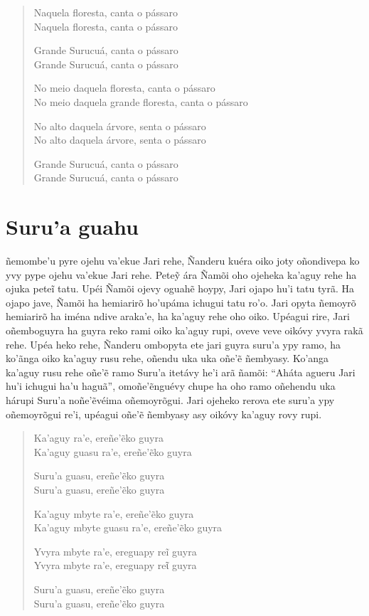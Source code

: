 \begin{verse}
Naquela floresta, canta o pássaro\\
Naquela floresta, canta o pássaro

Grande Surucuá, canta o pássaro\\
Grande Surucuá, canta o pássaro

No meio daquela floresta, canta o pássaro\\
No meio daquela grande floresta, canta o  pássaro

\pagebreak
No alto daquela árvore, senta o pássaro\\
No alto daquela árvore, senta o pássaro

Grande Surucuá, canta o pássaro\\
Grande Surucuá, canta o pássaro
\end{verse}

\chapter{Suru'a guahu}

 ñemombe'u pyre ojehu va'ekue Jari rehe, Ñanderu kuéra oiko joty
oñondivepa ko yvy pype ojehu va'ekue Jari rehe. Peteỹ ára Ñamõi oho
ojeheka ka'aguy rehe ha ojuka peteĩ tatu. Upéi Ñamõi ojevy oguahẽ hoypy,
Jari ojapo hu'i tatu tyrã. Ha ojapo jave, Ñamõi ha hemiarirõ ho'upáma
ichugui tatu ro'o. Jari opyta ñemoyrõ hemiarirõ ha iména ndive araka'e,
ha ka'aguy rehe oho oiko. Upéagui rire, Jari oñemboguyra ha guyra reko
rami oiko ka'aguy rupi, oveve veve oikóvy yvyra rakã rehe. Upéa heko
rehe, Ñanderu ombopyta ete jari guyra suru'a ypy ramo, ha ko'ãnga oiko
ka'aguy rusu rehe, oñendu uka uka oñe'ẽ ñembyasy. Ko'anga ka'aguy rusu
rehe oñe'ẽ ramo Suru'a itetávy he'i arã ñamõi: ``Aháta agueru Jari hu'i
ichugui ha'u haguã'', omoñe'ẽnguévy chupe ha oho ramo oñehendu uka
hárupi Suru'a noñe'ẽvéima oñemoyrõgui. Jari ojeheko rerova ete suru'a
ypy oñemoyrõgui re'i, upéagui oñe'ẽ ñembyasy asy oikóvy ka'aguy rovy
rupi.

\begin{verse}
Ka'aguy ra'e, ereñe'ẽko guyra\\
Ka'aguy guasu ra'e, ereñe'ẽko guyra
       
Suru'a guasu, ereñe'ẽko guyra\\
Suru'a guasu, ereñe'ẽko guyra
       
Ka'aguy mbyte ra'e, ereñe'ẽko guyra\\
Ka'aguy mbyte guasu ra'e, ereñe'ẽko guyra
       
Yvyra mbyte ra'e, ereguapy reĩ guyra\\ \EP[1]
Yvyra mbyte ra'e, ereguapy reῖ guyra
       
Suru'a guasu, ereñe'ẽko guyra\\
Suru'a guasu, ereñe'ẽko guyra
\end{verse}

